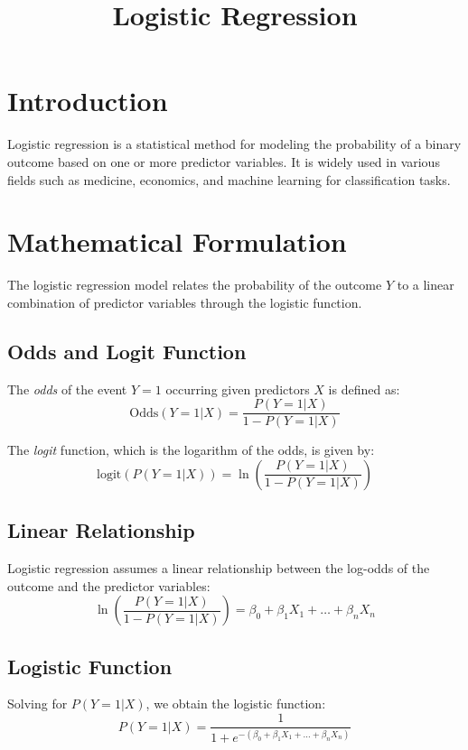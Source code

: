\documentclass{article}
\title{Logistic Regression}
\author{}
\date{}
\begin{document}
\maketitle

\section{Introduction}

Logistic regression is a statistical method for modeling the probability of a binary outcome based on one or more predictor variables. It is widely used in various fields such as medicine, economics, and machine learning for classification tasks.

\section{Mathematical Formulation}

The logistic regression model relates the probability of the outcome \( Y \) to a linear combination of predictor variables through the logistic function.

\subsection{Odds and Logit Function}

The \textit{odds} of the event \( Y = 1 \) occurring given predictors \( X \) is defined as:
\[
\text{Odds}(Y=1|X) = \frac{P(Y=1|X)}{1 - P(Y=1|X)}
\]

The \textit{logit} function, which is the logarithm of the odds, is given by:
\[
\text{logit}(P(Y=1|X)) = \ln\left( \frac{P(Y=1|X)}{1 - P(Y=1|X)} \right)
\]

\subsection{Linear Relationship}

Logistic regression assumes a linear relationship between the log-odds of the outcome and the predictor variables:
\[
\ln\left( \frac{P(Y=1|X)}{1 - P(Y=1|X)} \right) = \beta_0 + \beta_1 X_1 + \dots + \beta_n X_n
\]

\subsection{Logistic Function}

Solving for \( P(Y=1|X) \), we obtain the logistic function:
\[
P(Y=1|X) = \frac{1}{1 + e^{- (\beta_0 + \beta_1 X_1 + \dots + \beta_n X_n)}}
\]
\end{document}
